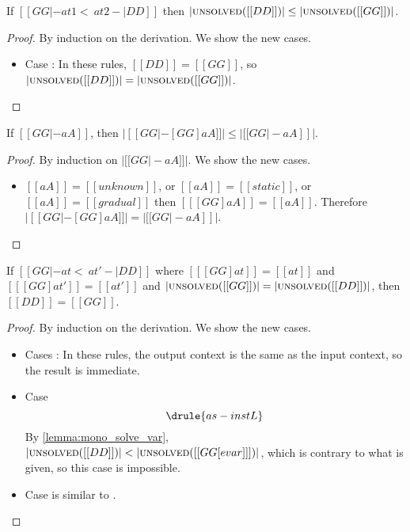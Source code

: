 \begin{lemma} \label{lemma:mono_mono}
  If $[[GG |- at1 <~ at2 -| DD]]$  then $| \textsc{unsolved}([[DD]]) | \leq |  \textsc{unsolved}([[GG]])    |$.
\end{lemma}
\begin{proof}
  By induction on the derivation. We show the new cases.
  \begin{itemize}
  \item Case : In these rules, $[[DD]] = [[GG]]$, so $| \textsc{unsolved}([[DD]]) | = |  \textsc{unsolved}([[GG]])    |$.
  \end{itemize}

\end{proof}


\begin{lemma} \label{lemma:subst_decrease}
  If $[[GG |- aA]]$, then $|[[  GG |-   [GG]aA    ]]| \leq  |  [[GG |-aA]]      |   $.
\end{lemma}
\begin{proof}
  By induction on $| [[ GG |- aA  ]] |$. We show the new cases.
  \begin{itemize}
  \item $[[aA]] = [[unknown]]$, or $[[aA]] = [[static]]$, or $[[aA]] = [[gradual]]$ then $[[  [GG] aA ]] = [[aA]]$. Therefore
    $|[[  GG |-   [GG]aA    ]]| =  |  [[GG |-aA]]      |   $.
  \end{itemize}
\end{proof}


\begin{lemma} \label{lemma:mono_inva}
  If $[[GG |- at <~ at' -| DD]]$ where $[[  [GG]at   ]] = [[at]]$ and $[[  [GG]at'   ]] = [[at']]$ and
  $|   \textsc{unsolved}([[GG]])      | = |  \textsc{unsolved}([[DD]])    |$, then $[[DD]] = [[GG]]$.
\end{lemma}
\begin{proof}
  By induction on the derivation. We show the new cases.
  \begin{itemize}
  \item Cases : In these rules, the output context is the
    same as the input context, so the result is immediate.
  \item Case \[  \drule{as-instL}   \]
    By \cref{lemma:mono_solve_var}, $|\textsc{unsolved}([[ DD ]])| < | \textsc{unsolved}([[ GG[evar]  ]])   |$, which is contrary to what is given,
    so this case is impossible.

  \item Case  is similar to .
  \end{itemize}

\end{proof}

